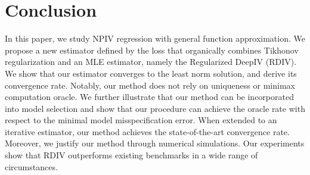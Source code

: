 \documentclass[12pt]{colt2024} %
\begin{document}
\section{Conclusion}
In this paper, we study NPIV regression with general function approximation. We propose a new estimator defined by the loss that organically combines Tikhonov regularization and an MLE estimator, namely the Regularized DeepIV (RDIV).  We show that our estimator converges to the least norm solution, and derive its convergence rate. Notably, our method does not rely on uniqueness or minimax computation oracle. We further illustrate that our method can be incorporated into model selection and show that our procedure can achieve the oracle rate with respect to the minimal model misspecification error. When extended to an iterative estimator, our method achieves the state-of-the-art convergence rate. Moreover, we justify our method through numerical simulations. Our experiments show that RDIV outperforms existing benchmarks in a wide range of circumstances.
\newpage

\newpage
\appendix


\end{document}
